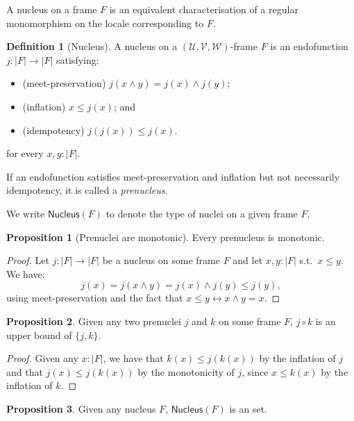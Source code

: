 \documentclass[a4paper, 11pt]{article}
\theoremstyle{definition}
\newtheorem{prop}{Proposition}
\newtheorem{defn}{Definition}
\newcommand{\UU}{\mathcal{U}}
\newcommand{\VV}{\mathcal{V}}
\newcommand{\WW}{\mathcal{W}}
\begin{document}
A nucleus on a frame $F$ is an equivalent characterisation of a regular monomorphism on the locale
corresponding to $F$.

\begin{defn}[Nucleus]
  A nucleus on a $(\UU, \VV, \WW)$-frame $F$ is an endofunction
  $j : | F | \rightarrow | F |$ satisfying:
  \begin{itemize}
    \item (meet-preservation) $j(x \wedge y) = j(x) \wedge j(y)$;
    \item (inflation) $x \le j(x)$; and
    \item (idempotency) $j(j(x)) \le j(x)$.
  \end{itemize}
  for every $x, y : | F |$.
\end{defn}

If an endofunction satisfies meet-preservation and inflation but not necessarily idempotency, it is
called a \emph{prenucleus}.

We write $\mathsf{Nucleus}(F)$ to denote the type of nuclei on a given frame $F$.

\begin{prop}[Prenuclei are monotonic]\label{prop:nuclei-mono}
  Every prenucleus is monotonic.
\end{prop}
\begin{proof}
  Let $j : | F | \rightarrow | F |$ be a nucleus on some frame $F$ and let $x, y : | F |$
  s.t.\ $x \le y$.
  We have:
  \begin{equation*}
    j(x) = j (x \wedge y) = j(x) \wedge j(y) \le j(y),
  \end{equation*}
  using meet-preservation and the fact that $x \le y \leftrightarrow x \wedge y = x$.
\end{proof}

\begin{prop}\label{prop:nucl-lemma-1}
  Given any two prenuclei $j$ and $k$ on some frame $F$, $j \circ k$ is an upper bound of $\{ j, k \}$.
\end{prop}
\begin{proof}
  Given any $x : | F |$, we have that $k(x) \le j(k(x))$ by the inflation of $j$ and that
  $j(x) \le j(k(x))$ by the monotonicity of $j$, since $x \le k(x)$ by the inflation of $k$.
\end{proof}

\begin{prop}
  Given any nucleus $F$, $\mathsf{Nucleus}(F)$ is an set.
\end{prop}
\end{document}
